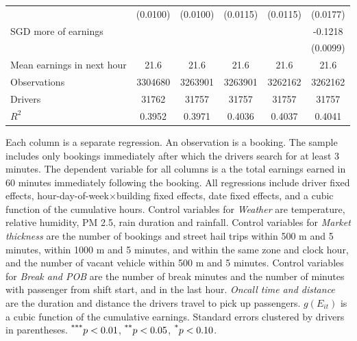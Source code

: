 \documentclass[reviewmode,AEJ]{AEA}
\begin{document}
\begin{table}[]
{\begin{tabularx}{\textwidth}{l@{\extracolsep{\fill}}*{5}{S[table-format = 0.4, table-space-text-pre={**}, table-space-text-post={-**}]}}
                &    (0.0100)         &    (0.0100)         &    (0.0115)         &    (0.0115)         &    (0.0177)         \\
     SGD more of earnings&                     &                     &                     &                     &     -0.1218\sym{***}         \\
                &                     &                     &                     &                     &    (0.0099)         \\
    \midrule
    Mean earnings in next hour&     \num{21.6}         &     \num{21.6}         &     \num{21.6}         &     \num{21.6}         &     \num{21.6}         \\
    Observations&\num{3304680}         &\num{3263901}         &\num{3263901}         &\num{3262162}         &\num{3262162}         \\
    Drivers     & \num{31762}         & \num{31757}         & \num{31757}         & \num{31757}         & \num{31757}         \\
    \(R^2\)     &      0.3952         &      0.3971         &      0.4036         &      0.4037         &      0.4041         \\
    \bottomrule
    \end{tabularx}
    }
	\begin{tablenotes}
	\small
        Each column is a separate regression. An observation is a booking. The sample includes only bookings immediately after which the drivers search for at least 3 minutes. The dependent variable for all columns is a the total earnings earned in 60 minutes immediately following the booking. All regressions include driver fixed effects, hour-day-of-week\(\times\)building fixed effects, date fixed effects, and a cubic function of the cumulative hours. Control variables for \textit{Weather} are temperature, relative humidity, PM 2.5, rain duration and rainfall. Control variables for \textit{Market thickness} are the number of bookings and street hail trips within 500 m and 5 minutes, within 1000 m and 5 minutes, and within the same zone and clock hour, and the number of vacant vehicle within 500 m and 5 minutes. Control variables for \textit{Break and POB} are the number of break minutes and the number of minutes with passenger from shift start, and in the last hour. \textit{Oncall time and distance} are the duration and distance the drivers travel to pick up passengers. \(g(E_{it})\) is a cubic function of the cumulative earnings. Standard errors clustered by drivers in parentheses. $\textsuperscript{***}p < 0.01$, $\textsuperscript{**}p < 0.05$, $\textsuperscript{*}p < 0.10$. 
	\end{tablenotes}
\end{table}
\end{document}

